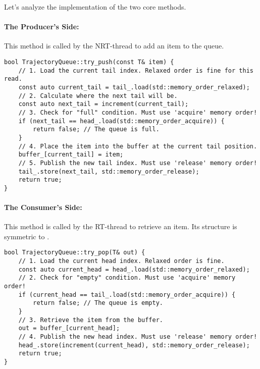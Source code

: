 Let's analyze the implementation of the two core methods.

\paragraph{The Producer's Side: }
This method is called by the NRT-thread to add an item to the queue.

\begin{verbatim}
bool TrajectoryQueue::try_push(const T& item) {
    // 1. Load the current tail index. Relaxed order is fine for this read.
    const auto current_tail = tail_.load(std::memory_order_relaxed);
    // 2. Calculate where the next tail will be.
    const auto next_tail = increment(current_tail);
    // 3. Check for "full" condition. Must use 'acquire' memory order!
    if (next_tail == head_.load(std::memory_order_acquire)) {
        return false; // The queue is full.
    }
    // 4. Place the item into the buffer at the current tail position.
    buffer_[current_tail] = item;
    // 5. Publish the new tail index. Must use 'release' memory order!
    tail_.store(next_tail, std::memory_order_release);
    return true;
}
\end{verbatim}
\label{lst:try-push}

\paragraph{The Consumer's Side: }
This method is called by the RT-thread to retrieve an item. Its structure is symmetric to .

\begin{verbatim}
bool TrajectoryQueue::try_pop(T& out) {
    // 1. Load the current head index. Relaxed order is fine.
    const auto current_head = head_.load(std::memory_order_relaxed);
    // 2. Check for "empty" condition. Must use 'acquire' memory order!
    if (current_head == tail_.load(std::memory_order_acquire)) {
        return false; // The queue is empty.
    }
    // 3. Retrieve the item from the buffer.
    out = buffer_[current_head];
    // 4. Publish the new head index. Must use 'release' memory order!
    head_.store(increment(current_head), std::memory_order_release);
    return true;
}
\end{verbatim}
\label{lst:try-pop}

